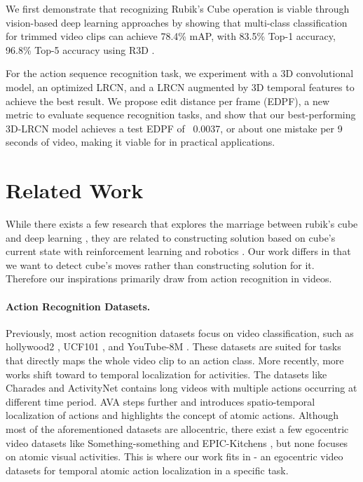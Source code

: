 \documentclass[10pt,twocolumn,letterpaper]{article}
\begin{document}
We first demonstrate that recognizing Rubik's Cube operation is viable through vision-based deep learning approaches by showing that multi-class classification for trimmed video clips can achieve  78.4\% mAP, with 83.5\% Top-1 accuracy, 96.8\% Top-5 accuracy using R3D \cite{r3d}. 

For the action sequence recognition task, we experiment with a 3D convolutional model, an optimized LRCN, and a LRCN augmented by 3D temporal features to achieve the best result. We propose edit distance per frame (EDPF), a new metric to evaluate sequence recognition tasks, and show that our best-performing 3D-LRCN model achieves a test EDPF of ~0.0037, or about one mistake per 9 seconds of video, making it viable for in practical applications.


\section{Related Work}

While there exists a few research that explores the marriage between rubik's cube and deep learning \cite{cube_robotics, cube_rl}, they are related to constructing solution based on cube's current state with reinforcement learning \cite{cube_rl} and robotics \cite{cube_robotics}. Our work differs in that we want to detect cube's moves rather than constructing solution for it. Therefore our inspirations primarily draw from action recognition in videos. 
\vspace{-2mm}

\paragraph{Action Recognition Datasets.} Previously, most action recognition datasets focus on video classification, such as hollywood2 \cite{hollywood2}, UCF101 \cite{ucf101}, and YouTube-8M \cite{youtube8m}. These datasets are suited for tasks that directly maps the whole video clip to an action class. More recently, more works shift toward to temporal localization for activities. The datasets like Charades \cite{charades} and ActivityNet \cite{activitynet} contains long videos 
with multiple actions occurring at different time period. AVA \cite{ava} steps further and introduces spatio-temporal localization of actions and highlights the concept of atomic actions. Although most of the aforementioned datasets are allocentric, there exist a few egocentric video datasets like Something-something \cite {sthsth} and EPIC-Kitchens \cite{epic_kitchen}, but none focuses on atomic visual activities. This is where our work fits in - an egocentric video datasets for temporal atomic action localization in a specific task.
\end{document}

